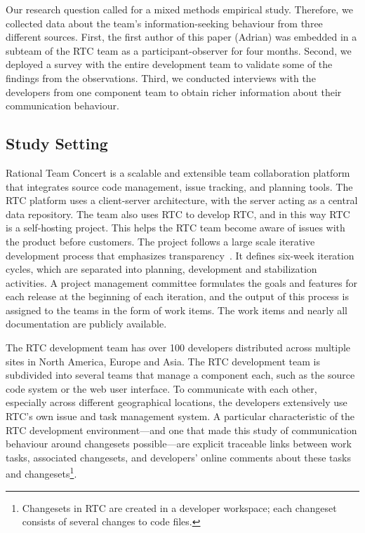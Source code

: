 \documentclass[12pt,oneside]{book}
\begin{document}
Our research question called for a mixed methods empirical study. Therefore, we collected data about the team's information-seeking behaviour from three different sources.
First, the first author of this paper (Adrian) was embedded in a subteam of the RTC team as a participant-observer for four months.
Second, we deployed a survey with the entire development team to validate some of the findings from the observations.
Third, we conducted interviews with the developers from one component team to obtain richer information about their communication behaviour.

\subsection{Study Setting}
\label{sec:rtc}
 
Rational Team Concert is a scalable and extensible team collaboration platform that integrates source code management, issue tracking, and planning tools. The RTC platform uses a client-server architecture, with the server acting as a central data repository.
The team also uses RTC to develop RTC, and in this way RTC is a self-hosting project.
This helps the RTC team become aware of issues with the product before customers.%
The project follows a large scale iterative development process that emphasizes transparency~\cite{frost:ieeesoftware:2007}.
It defines six-week iteration cycles, which are  separated into planning, development and stabilization activities. A project management committee formulates the goals and features for each release at the beginning of each iteration, and the output of this process is assigned to the teams in the form of work items. The work items and nearly all documentation are publicly available.  %

The RTC development team has over 100 developers distributed across multiple sites in North America, Europe and Asia.  The RTC development team is subdivided into several teams that manage a component each, such as the source code system or the web user interface. To communicate with each other, especially across different geographical locations, the developers extensively use RTC's own issue and task management system. A particular characteristic of the RTC development environment---and one that made this study of communication behaviour around changesets possible---are explicit traceable links between work tasks, associated changesets, and developers' online comments about these tasks and changesets\footnote{Changesets in RTC are created in a developer workspace; each changeset consists of several changes to code files.}.
\end{document}
